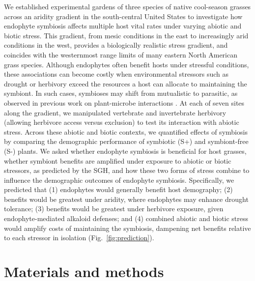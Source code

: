 \documentclass[12pt]{article}\usepackage[]{graphicx}\usepackage[dvipsnames]{xcolor}
\begin{document}
We established experimental gardens of three species of native cool-season grasses across an aridity gradient in the south-central United States to investigate how endophyte symbiosis affects multiple host vital rates under varying abiotic and biotic stress. 
This gradient, from mesic conditions in the east to increasingly arid conditions in the west, provides a biologically realistic stress gradient, and coincides with the westernmost range limits of many eastern North American grass species. 
Although endophytes often benefit hosts under stressful conditions, these associations can become costly when environmental stressors such as drought or herbivory exceed the resources a host can allocate to maintaining the symbiont. 
In such cases, symbioses may shift from mutualistic to parasitic, as observed in previous work on plant-microbe interactions \citep{johnson1997functioning}.
At each of seven sites along the gradient, we manipulated vertebrate and invertebrate herbivory (allowing herbivore access versus exclusion) to test its interaction with abiotic stress.
Across these abiotic and biotic contexts, we quantified effects of symbiosis by comparing the demographic performance of symbiotic (S+) and  symbiont-free (S-) plants. 
We asked whether endophyte symbiosis is beneficial for host grasses, whether symbiont benefits are amplified under exposure to abiotic or biotic stressors, as predicted by the SGH, and how these two forms of stress combine to influence the demographic outcomes of endophyte symbiosis.
Specifically, we predicted that (1) endophytes would generally benefit host demography; (2) benefits would be greatest under aridity, where endophytes may enhance drought tolerance; (3) benefits would be greatest under herbivore exposure, given endophyte-mediated alkaloid defenses; and (4) combined abiotic and biotic stress would amplify costs of maintaining the symbiosis, dampening net benefits relative to each stressor in isolation (Fig.~\ref{fig:prediction}).
\section*{Materials and methods}
\end{document}
